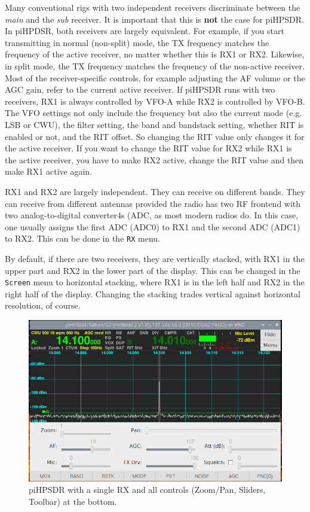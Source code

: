 \documentclass[12pt]{book}
\def\bltt#1{\texttt{\color{blue}#1}}
\begin{document}
 Many conventional rigs with two independent receivers discriminate
 between the \textit{main} and the \textit{sub} receiver. It is important that
 this is \textbf{not} the case for piHPSDR. In piHPDSR, both  receivers are
 largely equivalent. For example, if you start transmitting in
 normal (non-split) mode, the TX frequency matches the frequency
 of the active receiver, no matter whether this is RX1 or RX2.
 Likewise, in split mode, the TX frequency matches the frequency
 of the non-active receiver. Most of the receiver-specific controls,
 for example adjusting the AF volume or the AGC gain, refer to the
 current active receiver. If piHPSDR runs with two receivers,
 RX1 is always controlled by VFO-A while RX2 is controlled by VFO-B.
 The VFO settings not only include the frequency but also the
 current mode (e.g. LSB or CWU), the filter setting, the band and
 bandstack setting, whether RIT is enabled or not, and the RIT
 offset. So changing the RIT value only changes it for the active
 receiver. If you want  to change the RIT value for RX2 while RX1 is
 the active receiver, you have to make RX2 active, change the RIT
 value and then make RX1 active again.

 RX1 and RX2 are largely independent. They can receive on different
 bands. They can receive from different antennas provided the radio
 has two RF frontend with two analog-to-digital converter4s (ADC,
 as most modern radios do. In this case, one usually
 assigns the first ADC (ADC0) to RX1 and the second ADC (ADC1) to
 RX2. This can be done in the \bltt{RX} menu.

 By default, if there are two receivers, they are vertically stacked,
 with RX1 in the upper part and RX2 in the lower part of the display.
 This can be changed in the \bltt{Screen} menu to horizontal stacking,
 where RX1 is  in the left half and RX2 in the right half of  the
 display. Changing the stacking trades vertical against horizontal
 resolution, of course.


\begin{figure}[ht]
\center
\includegraphics[width=12cm]{SingleReceiver.png}
\caption{piHPSDR with a single RX and all controls (Zoom/Pan,
Sliders, Toolbar) at the  bottom.}
\label{fig:SingleReceiver}
\end{figure}
\end{document}
